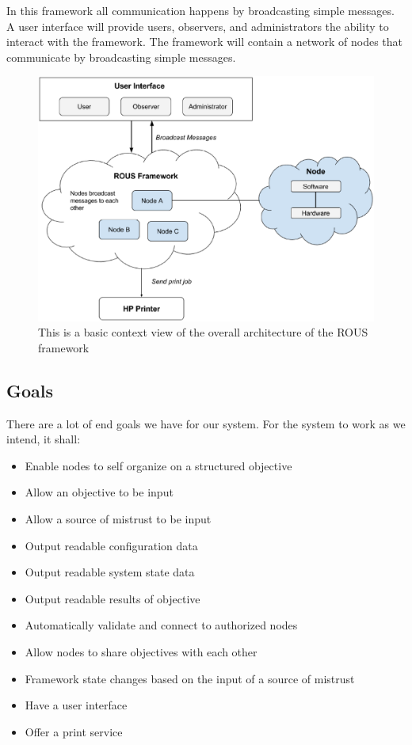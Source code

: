 \documentclass[draftclsnofoot, onecolumn, compsoc, 10pt]{IEEEtran}
\begin{document}
In this framework all communication happens by broadcasting simple messages. A user interface will provide users, observers, and administrators the ability to interact with the framework. The framework will contain a network of nodes that communicate by broadcasting simple messages. 
\begin{figure}[H]
\centering
	\includegraphics[scale=.45]{context}
	\captionsetup{justification=centering}
    \caption{This is a basic context view of the overall architecture of the ROUS framework}
\end{figure}

\subsection{Goals}
There are a lot of end goals we have for our system. For the system to work as we intend, it shall:
\begin{itemize}
\item Enable nodes to self organize on a structured objective
\item Allow an objective to be input
\item Allow a source of mistrust to be input
\item Output readable configuration data
\item Output readable system state data
\item Output readable results of objective
\item Automatically validate and connect to authorized nodes
\item Allow nodes to share objectives with each other
\item Framework state changes based on the input of a source of mistrust
\item Have a user interface
\item Offer a print service
\end{itemize}
\end{document}
